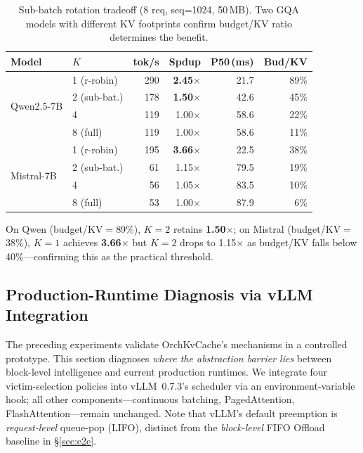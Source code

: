 \documentclass[conference]{IEEEtran}
\begin{document}
\begin{table}[t]
\centering
\caption{Sub-batch rotation tradeoff (8 req, seq=1024, 50\,MB). Two GQA models with different KV footprints confirm budget/KV ratio determines the benefit.}
\label{tab:subbatch}
\small
\setlength{\tabcolsep}{3.5pt}
\begin{tabular}{@{}llrrrr@{}}
\toprule
Model & $K$ & tok/s & Spdup & P50\,(ms) & Bud/KV \\
\midrule
\multirow{4}{*}{Qwen2.5-7B}
& 1 (r-robin)  & 290 & \textbf{2.45$\times$} & 21.7 & 89\% \\
& 2 (sub-bat.) & 178 & \textbf{1.50$\times$} & 42.6 & 45\% \\
& 4            & 119 & 1.00$\times$ & 58.6 & 22\% \\
& 8 (full)     & 119 & 1.00$\times$ & 58.6 & 11\% \\
\midrule
\multirow{4}{*}{Mistral-7B}
& 1 (r-robin)  & 195 & \textbf{3.66$\times$} & 22.5 & 38\% \\
& 2 (sub-bat.) & 61  & 1.15$\times$ & 79.5 & 19\% \\
& 4            & 56  & 1.05$\times$ & 83.5 & 10\% \\
& 8 (full)     & 53  & 1.00$\times$ & 87.9 & 6\% \\
\bottomrule
\end{tabular}
\end{table}

On Qwen (budget/KV$=$89\%), $K{=}2$ retains \textbf{1.50$\times$}; on Mistral (budget/KV$=$38\%), $K{=}1$ achieves \textbf{3.66$\times$} but $K{=}2$ drops to 1.15$\times$ as budget/KV falls below 40\%---confirming this as the practical threshold.

\subsection{Production-Runtime Diagnosis via vLLM Integration}
\label{sec:vllm-integration}

The preceding experiments validate OrchKvCache's mechanisms in a controlled prototype. This section diagnoses \emph{where the abstraction barrier lies} between block-level intelligence and current production runtimes. We integrate four victim-selection policies into vLLM~0.7.3's scheduler via an environment-variable hook; all other components---continuous batching, PagedAttention, FlashAttention---remain unchanged. Note that vLLM's default preemption is \emph{request-level} queue-pop (LIFO), distinct from the \emph{block-level} FIFO Offload baseline in \S\ref{sec:e2e}.
\end{document}
